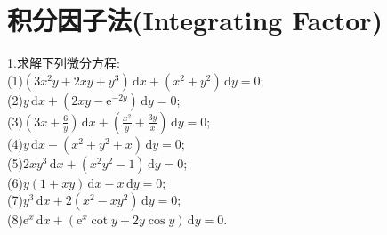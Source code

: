 \documentclass[titlepage,11pt,a4paper,twoside]{report}
\newcommand\diff{\,\mathrm{d}}
\newcommand\e{\mathrm{e}}
\begin{document}
\section{积分因子法(Integrating Factor)}
1.求解下列微分方程:\\
(1)$\displaystyle(3x^2y+2xy+y^3)\diff x+(x^2+y^2)\diff y=0$;\\
(2)$\displaystyle y\diff x+(2xy-\e^{-2y})\diff y=0$;\\
(3)$\displaystyle\left(3x+\frac{6}{y}\right)\diff x+\left(\frac{x^2}{y}+\frac{3y}{x}\right)\diff y=0$;\\
(4)$\displaystyle y\diff x-(x^2+y^2+x)\diff y=0$;\\
(5)$\displaystyle 2xy^3\diff x+(x^2y^2-1)\diff y=0$;\\
(6)$\displaystyle y(1+xy)\diff x-x\diff y=0$;\\
(7)$\displaystyle y^3\diff x+2(x^2-xy^2)\diff y=0$;\\
(8)$\displaystyle\e^x\diff x+(\e^x\cot y+2y\cos y)\diff y=0$.
\end{document}
